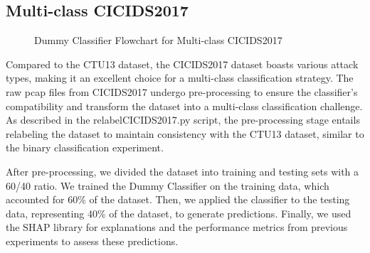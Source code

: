 \subsection{Multi-class CICIDS2017}\label{subsec:DummyClassifierMultiCICIDS2017}

\begin{figure}[H]
\centering
{}
\caption{Dummy Classifier Flowchart for Multi-class CICIDS2017}\label{fig:DummyRandomFlowMultiCICIDS2017}
\end{figure}

Compared to the CTU13 dataset, the CICIDS2017 dataset boasts various attack types, making it an excellent choice for a multi-class classification strategy. The raw pcap files from CICIDS2017 undergo pre-processing to ensure the classifier's compatibility and transform the dataset into a multi-class classification challenge. As described in the relabelCICIDS2017.py script, the pre-processing stage entails relabeling the dataset to maintain consistency with the CTU13 dataset, similar to the binary classification experiment.

After pre-processing, we divided the dataset into training and testing sets with a 60/40 ratio. We trained the Dummy Classifier on the training data, which accounted for 60\% of the dataset. Then, we applied the classifier to the testing data, representing 40\% of the dataset, to generate predictions. Finally, we used the SHAP library for explanations and the performance metrics from previous experiments to assess these predictions.

